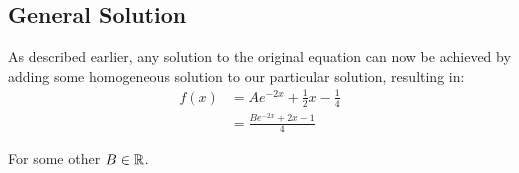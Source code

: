 \subsection*{General Solution}

    As described earlier, any solution to the original equation can now be achieved by adding some homogeneous solution to our particular solution, resulting in:
    \begin{align}
        f(x) &= A e^{-2x} + \frac{1}{2} x - \frac{1}{4} \nonumber\\
        &= \frac{B e^{-2x} + 2x - 1}{4} \label{eq:general}
    \end{align}

    For some other $B \in \operatorname{\mathbb{R}}$.

